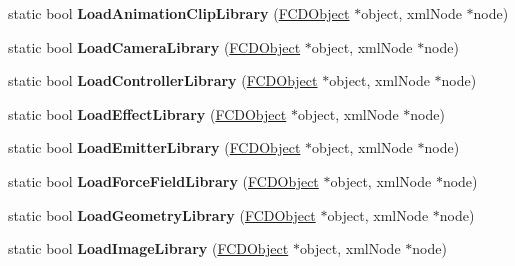 \begin{DoxyCompactItemize}
\item 
\hypertarget{classFArchiveXML_a6d626a607be69305bd828079d21b0e34}{
static bool {\bfseries LoadAnimationClipLibrary} (\hyperlink{classFCDObject}{FCDObject} $\ast$object, xmlNode $\ast$node)}
\label{classFArchiveXML_a6d626a607be69305bd828079d21b0e34}

\item 
\hypertarget{classFArchiveXML_acec8ee660cfd5b3e35c7f45fca2794ad}{
static bool {\bfseries LoadCameraLibrary} (\hyperlink{classFCDObject}{FCDObject} $\ast$object, xmlNode $\ast$node)}
\label{classFArchiveXML_acec8ee660cfd5b3e35c7f45fca2794ad}

\item 
\hypertarget{classFArchiveXML_aac999f8eb64c3c747f4dfd7224ba1abf}{
static bool {\bfseries LoadControllerLibrary} (\hyperlink{classFCDObject}{FCDObject} $\ast$object, xmlNode $\ast$node)}
\label{classFArchiveXML_aac999f8eb64c3c747f4dfd7224ba1abf}

\item 
\hypertarget{classFArchiveXML_a732a244adfa1ccb499d3272f7969792d}{
static bool {\bfseries LoadEffectLibrary} (\hyperlink{classFCDObject}{FCDObject} $\ast$object, xmlNode $\ast$node)}
\label{classFArchiveXML_a732a244adfa1ccb499d3272f7969792d}

\item 
\hypertarget{classFArchiveXML_a00547f5cc81d25d6b3935523029bf4a3}{
static bool {\bfseries LoadEmitterLibrary} (\hyperlink{classFCDObject}{FCDObject} $\ast$object, xmlNode $\ast$node)}
\label{classFArchiveXML_a00547f5cc81d25d6b3935523029bf4a3}

\item 
\hypertarget{classFArchiveXML_a2e9aaf9b0dd5aedc9850b186262a025a}{
static bool {\bfseries LoadForceFieldLibrary} (\hyperlink{classFCDObject}{FCDObject} $\ast$object, xmlNode $\ast$node)}
\label{classFArchiveXML_a2e9aaf9b0dd5aedc9850b186262a025a}

\item 
\hypertarget{classFArchiveXML_a4427f2b8a567a3613d7a0244545db4aa}{
static bool {\bfseries LoadGeometryLibrary} (\hyperlink{classFCDObject}{FCDObject} $\ast$object, xmlNode $\ast$node)}
\label{classFArchiveXML_a4427f2b8a567a3613d7a0244545db4aa}

\item 
\hypertarget{classFArchiveXML_a96422a34a7f453856cf6f45d49aabec2}{
static bool {\bfseries LoadImageLibrary} (\hyperlink{classFCDObject}{FCDObject} $\ast$object, xmlNode $\ast$node)}
\label{classFArchiveXML_a96422a34a7f453856cf6f45d49aabec2}


\end{DoxyCompactItemize}
